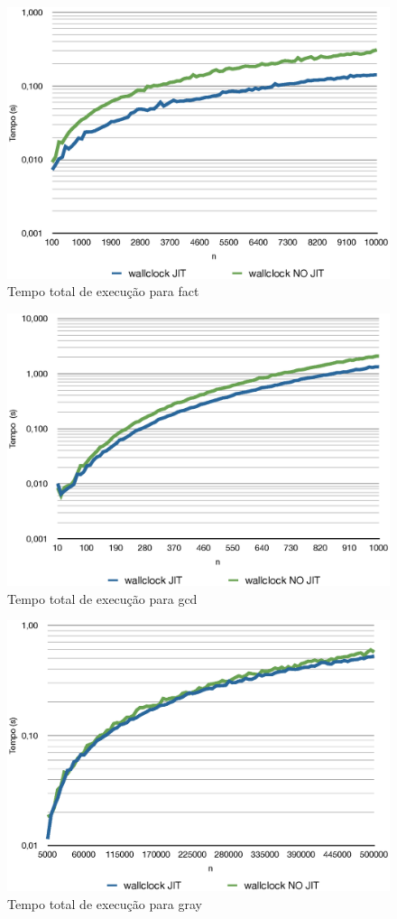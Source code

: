\begin{figure}[ht!]
  \centering
  \includegraphics[scale=0.70]{figs/fact_tempo}
  \caption{Tempo total de execução para fact \label{fig:fact-tempo}}
\end{figure}
\begin{figure}[ht!]
  \centering
  \includegraphics[scale=0.70]{figs/gcd_tempo}
  \caption{Tempo total de execução para gcd \label{fig:gcd-tempo}}
\end{figure}
\begin{figure}[ht!]
  \centering
  \includegraphics[scale=0.70]{figs/gray_tempo}
  \caption{Tempo total de execução para gray \label{fig:gray-tempo}}
\end{figure}
